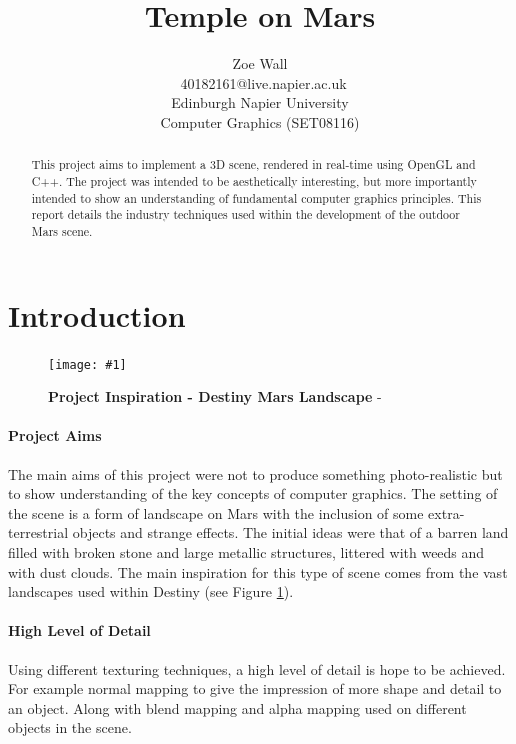 \documentclass[conference]{acmsiggraph}
\title{Temple on Mars}
\author{Zoe Wall \\\ 40182161@live.napier.ac.uk \\
Edinburgh Napier University \\
Computer Graphics (SET08116)}
\newcommand{\figuremacroW}[4]{
\begin{figure}[h] %
	\centering
	\texttt{[image: \#1]}
	\caption[#2]{\textbf{#2} - #3}
	\label{fig:#1}
\end{figure}
}
\begin{document}
	
	
\maketitle
	
\begin{abstract}
	This project aims to implement a 3D scene, rendered in real-time using OpenGL and C++. The project was intended to be aesthetically interesting, but more importantly intended to show an understanding of fundamental computer graphics principles. This report details the industry techniques used within the development of the outdoor Mars scene.
\end{abstract}
	
\keywordlist
	
\section{Introduction}
	
\figuremacroW
{DestinyMars1}
{Project Inspiration - Destiny Mars Landscape}
{\protect\cite{Destiny}}
{1.0}
	
\paragraph{Project Aims}The main aims of this project were not to produce something photo-realistic but to show understanding of the key concepts of computer graphics. The setting of the scene is a form of landscape on Mars with the inclusion of some extra-terrestrial objects and strange effects. The initial ideas were that of a barren land filled with broken stone and large metallic structures, littered with weeds and with dust clouds. The main inspiration for this type of scene comes from the vast landscapes used within Destiny (see Figure \ref{fig:DestinyMars1}).
	
\paragraph{High Level of Detail} Using different texturing techniques, a high level of detail is hope to be achieved. For example normal mapping to give the impression of more shape and detail to an object. Along with blend mapping and alpha mapping used on different objects in the scene.
	
\end{document}
